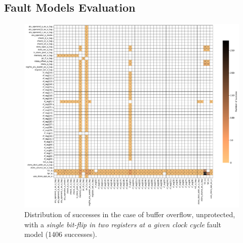 \subsection{Fault Models Evaluation}

\begin{figure}[ht]
    \centering
    \includegraphics[width=\textwidth]{c6_group_composition/img/heatmap_buffer_overflow_wop_1_single_bitflip_spatial_2.pdf}
    \caption{Distribution of successes in the case of buffer overflow, unprotected, with a \textit{single bit-flip in two registers at a given clock cycle} fault model (1406 successes).}
    \label{fig:heatmap_bo_spatial_wop}
\end{figure}


